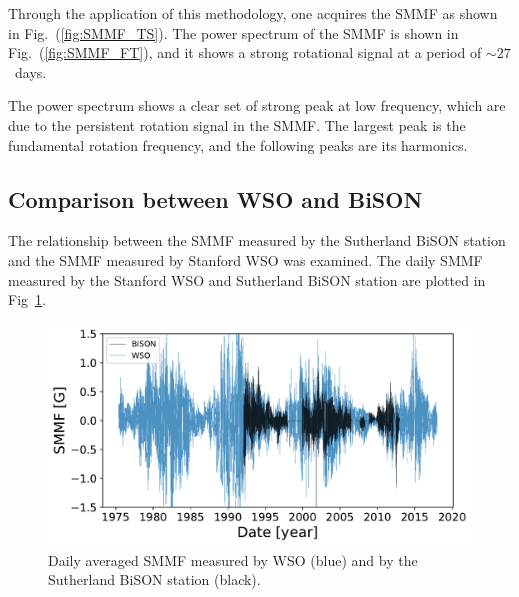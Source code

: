 Through the application of this methodology, one acquires the SMMF as shown in Fig.~(\ref{fig:SMMF_TS}). The power spectrum of the SMMF is shown in Fig.~(\ref{fig:SMMF_FT}), and it shows a strong rotational signal at a period of $\sim27$~days. 



The power spectrum shows a clear set of strong peak at low frequency, which are due to the persistent rotation signal in the SMMF. The largest peak is the fundamental rotation frequency, and the following peaks are its harmonics.


\subsection{Comparison between WSO and BiSON}

The relationship between the SMMF measured by the Sutherland BiSON station and the SMMF measured by Stanford WSO was examined. The daily SMMF measured by the Stanford WSO and Sutherland BiSON station are plotted in Fig~\ref{fig:BiSON_and_WSO}.

\begin{figure}[ht!]
    \centering
	\includegraphics[width=\columnwidth]{BiSON_and_WSO.pdf}
    \caption{Daily averaged SMMF measured by WSO (blue) and by the Sutherland BiSON station (black).}
    \label{fig:BiSON_and_WSO}
\end{figure}

